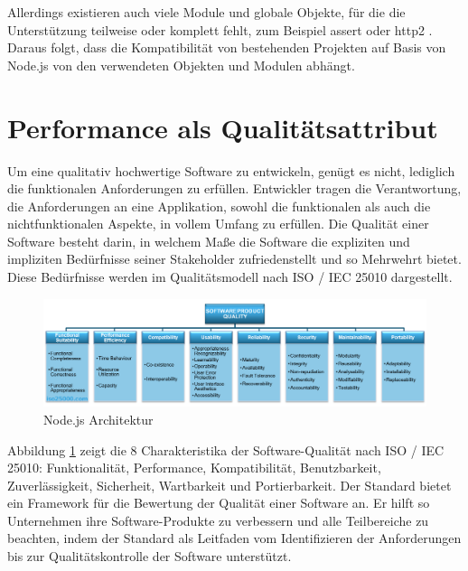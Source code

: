 \noindent
Allerdings existieren auch viele Module und globale Objekte, für die die Unterstützung teilweise oder komplett fehlt, zum Beispiel assert oder http2 \cite{Bun.}. Daraus folgt, dass die Kompatibilität von bestehenden Projekten auf Basis von Node.js von den verwendeten Objekten und Modulen abhängt.

\section{Performance als Qualitätsattribut} \label{sec:foundations-Performance}
Um eine qualitativ hochwertige Software zu entwickeln, genügt es nicht, lediglich die funktionalen Anforderungen zu erfüllen. Entwickler tragen die Verantwortung, die Anforderungen an eine Applikation, sowohl die funktionalen als auch die nichtfunktionalen Aspekte, in vollem Umfang zu erfüllen. Die Qualität einer Software besteht darin, in welchem Maße die Software die expliziten und impliziten Bedürfnisse seiner Stakeholder zufriedenstellt und so Mehrwehrt bietet. Diese Bedürfnisse werden im Qualitätsmodell nach ISO / IEC 25010 dargestellt. \cite{.2022}\\

\begin{figure}[h]
	\centering
	\includegraphics[width=\linewidth]{./images/iso25010.png}
	\caption[Node.js Architektur]{Node.js Architektur \cite{.2022}}
	\label{fig:softwareQuality}
\end{figure}

Abbildung \ref{fig:softwareQuality} zeigt die 8 Charakteristika der Software-Qualität nach ISO / IEC 25010: Funktionalität, Performance, Kompatibilität, Benutzbarkeit, Zuverlässigkeit, Sicherheit, Wartbarkeit und Portierbarkeit. Der Standard bietet ein Framework für die Bewertung der Qualität einer Software an. Er hilft so Unternehmen ihre Software-Produkte zu verbessern und alle Teilbereiche zu beachten, indem der Standard als Leitfaden vom Identifizieren der Anforderungen bis zur Qualitätskontrolle der Software unterstützt. \cite{ISOIEC.}\\

